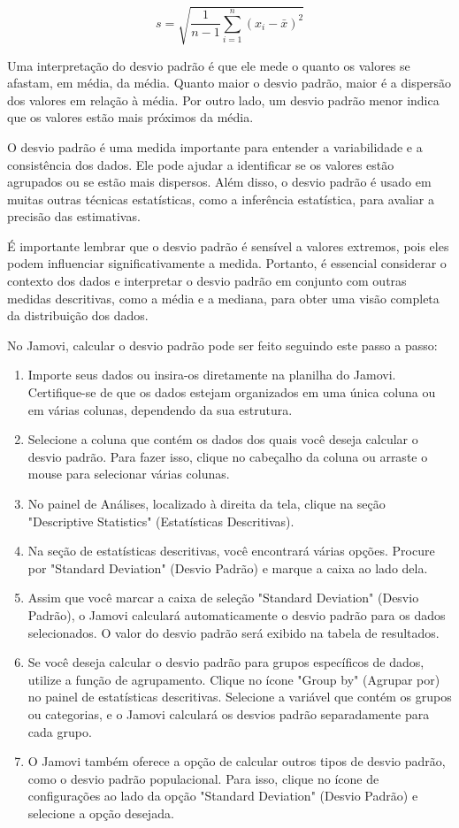 \[
s = \sqrt{\frac{1}{n-1} \sum_{i=1}^{n} (x_i - \bar{x})^2}
\]

Uma interpretação do desvio padrão é que ele mede o quanto os valores se afastam, em média, da média. Quanto maior o desvio padrão, maior é a dispersão dos valores em relação à média. Por outro lado, um desvio padrão menor indica que os valores estão mais próximos da média.

O desvio padrão é uma medida importante para entender a variabilidade e a consistência dos dados. Ele pode ajudar a identificar se os valores estão agrupados ou se estão mais dispersos. Além disso, o desvio padrão é usado em muitas outras técnicas estatísticas, como a inferência estatística, para avaliar a precisão das estimativas.

É importante lembrar que o desvio padrão é sensível a valores extremos, pois eles podem influenciar significativamente a medida. Portanto, é essencial considerar o contexto dos dados e interpretar o desvio padrão em conjunto com outras medidas descritivas, como a média e a mediana, para obter uma visão completa da distribuição dos dados.

No Jamovi, calcular o desvio padrão pode ser feito seguindo este passo a passo:

\begin{enumerate}
    \item Importe seus dados ou insira-os diretamente na planilha do Jamovi. Certifique-se de que os dados estejam organizados em uma única coluna ou em várias colunas, dependendo da sua estrutura.
    \item Selecione a coluna que contém os dados dos quais você deseja calcular o desvio padrão. Para fazer isso, clique no cabeçalho da coluna ou arraste o mouse para selecionar várias colunas.
    \item No painel de Análises, localizado à direita da tela, clique na seção "Descriptive Statistics" (Estatísticas Descritivas).
    \item Na seção de estatísticas descritivas, você encontrará várias opções. Procure por "Standard Deviation" (Desvio Padrão) e marque a caixa ao lado dela.
    \item Assim que você marcar a caixa de seleção "Standard Deviation" (Desvio Padrão), o Jamovi calculará automaticamente o desvio padrão para os dados selecionados. O valor do desvio padrão será exibido na tabela de resultados.
    \item Se você deseja calcular o desvio padrão para grupos específicos de dados, utilize a função de agrupamento. Clique no ícone "Group by" (Agrupar por) no painel de estatísticas descritivas. Selecione a variável que contém os grupos ou categorias, e o Jamovi calculará os desvios padrão separadamente para cada grupo.
    \item O Jamovi também oferece a opção de calcular outros tipos de desvio padrão, como o desvio padrão populacional. Para isso, clique no ícone de configurações ao lado da opção "Standard Deviation" (Desvio Padrão) e selecione a opção desejada.
\end{enumerate}